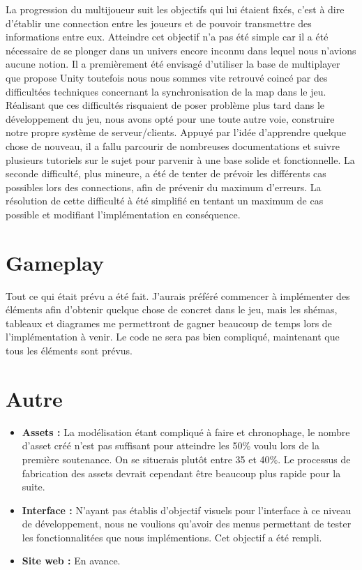 \documentclass[12pt]{report}
\begin{document}
La progression du multijoueur suit les objectifs qui lui étaient fixés, c’est à dire d’établir une connection entre les joueurs et de pouvoir transmettre des informations entre eux. Atteindre cet objectif n’a pas été simple car il a été nécessaire de se plonger dans un univers encore inconnu dans lequel nous n’avions aucune notion. Il a premièrement été envisagé d’utiliser la base de multiplayer que propose Unity toutefois nous nous sommes vite retrouvé coincé par des difficultées techniques concernant la synchronisation de la map dans le jeu. Réalisant que ces difficultés risquaient de poser problème plus tard dans le développement du jeu, nous avons opté pour une toute autre voie, construire notre propre système de serveur/clients. Appuyé par l’idée d’apprendre quelque chose de nouveau, il a fallu parcourir de nombreuses documentations et suivre plusieurs tutoriels sur le sujet pour parvenir à une base solide et fonctionnelle. La seconde difficulté, plus mineure, a été de tenter de prévoir les différents cas possibles lors des connections, afin de prévenir du maximum d’erreurs. La résolution de cette difficulté à été simplifié en tentant un maximum de cas possible et modifiant l’implémentation en conséquence.

\section*{Gameplay}

Tout ce qui était prévu a été fait. J'aurais préféré commencer à implémenter des éléments afin d'obtenir quelque chose de concret dans le jeu, mais les shémas, tableaux et diagrames me permettront de gagner beaucoup de temps lors de l'implémentation à venir. Le code ne sera pas bien compliqué, maintenant que tous les éléments sont prévus.

\section*{Autre}

\begin{itemize}
    \item \textbf{Assets :} La modélisation étant compliqué à faire et chronophage, le nombre d’asset créé n’est pas suffisant pour atteindre les 50\% voulu lors de la première soutenance. On se situerais plutôt entre 35 et 40\%. Le processus de fabrication des assets devrait cependant être beaucoup plus rapide pour la suite.
    \item \textbf{Interface :} N’ayant pas établis d’objectif visuels pour l’interface à ce niveau de développement, nous ne voulions qu’avoir des menus permettant de tester les fonctionnalitées que nous implémentions. Cet objectif a été rempli.
    \item \textbf{Site web :} En avance.
\end{itemize}
\end{document}
